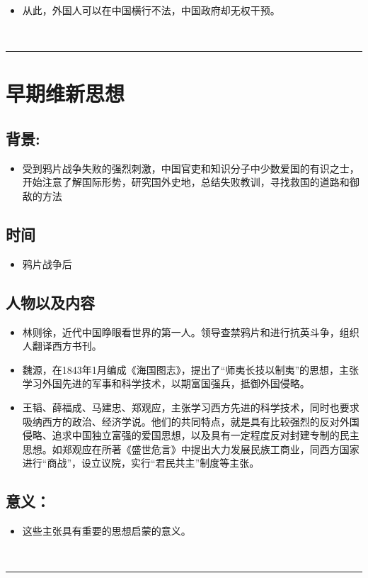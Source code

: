 \documentclass{article}
\begin{document}
\begin{itemize}
	\item 从此，外国人可以在中国横行不法，中国政府却无权干预。
\end{itemize}
\ \hrule

\section*{早期维新思想}
\subsection*{背景:}
\begin{itemize}
	\item 受到鸦片战争失败的强烈刺激，中国官吏和知识分子中少数爱国的有识之士，开始注意了解国际形势，研究国外史地，总结失败教训，寻找救国的道路和御敌的方法
\end{itemize}
\subsection*{时间}
\begin{itemize}
	\item 鸦片战争后
\end{itemize}
\subsection*{人物以及内容}
\begin{itemize}
    \item 林则徐，近代中国睁眼看世界的第一人。领导查禁鸦片和进行抗英斗争，组织人翻译西方书刊。
    \item 魏源，在1843年1月编成《海国图志》，提出了“师夷长技以制夷”的思想，主张学习外国先进的军事和科学技术，以期富国强兵，抵御外国侵略。
    \item 王韬、薛福成、马建忠、郑观应，主张学习西方先进的科学技术，同时也要求吸纳西方的政治、经济学说。他们的共同特点，就是具有比较强烈的反对外国侵略、追求中国独立富强的爱国思想，以及具有一定程度反对封建专制的民主思想。如郑观应在所著《盛世危言》中提出大力发展民族工商业，同西方国家进行“商战”，设立议院，实行“君民共主”制度等主张。
\end{itemize}
\subsection*{意义：}
\begin{itemize}
	\item 这些主张具有重要的思想启蒙的意义。
\end{itemize}
\ \hrule
\end{document}
